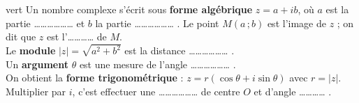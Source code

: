 \documentclass[11pt,a4paper]{article}
\begin{document}
\begin{encadre}[À retenir]{vert}
Un nombre complexe s'écrit sous \textbf{forme algébrique} $z = a + ib$, où $a$ est la partie
\dots\dots\dots\dots\dots\dots{} et $b$ la partie \dots\dots\dots\dots\dots\dots{} .
Le point $M(a\,;b)$ est l'image de $z$ ; on dit que $z$ est l'\dots\dots\dots\dots{} de $M$.\\[4pt]
Le \textbf{module} $|z| = \sqrt{a^2+b^2}$ est la distance \dots\dots\dots\dots\dots\dots{} .\\
Un \textbf{argument} $\theta$ est une mesure de l'angle \dots\dots\dots\dots\dots\dots{} .\\[4pt]
On obtient la \textbf{forme trigonométrique} : \quad
$\boxed{z = r(\cos\theta + i\sin\theta)}$ \quad avec $r = |z|$.\\[4pt]
Multiplier par $i$, c'est effectuer une \dots\dots\dots\dots\dots\dots{} de centre $O$
et d'angle \dots\dots\dots\dots{} .
\end{encadre}
\end{document}
